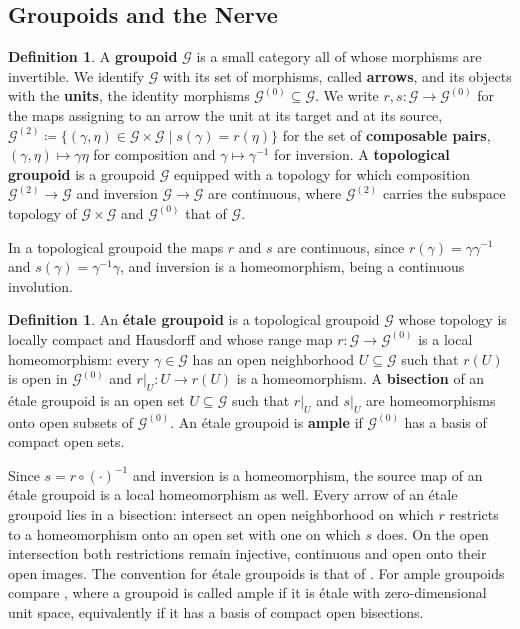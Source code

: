 \documentclass{extracta-temp-26}
\makeatletter
\numberwithin{equation}{section}
\theoremstyle{definition}
\newtheorem{defi}[teo]{Definition}
\theoremstyle{remark}
\newcommand{\G}{\mathcal{G}}
\newcommand{\restr}[2]{#1\rvert_{#2}}
\newcommand{\term}[1]{\textbf{#1}}
\newcommand{\keepwithnext}{\leavevmode\par\nobreak\@afterheading}
\newcommand{\subhead}[1]{\subsection*{#1}\keepwithnext}
\makeatother
\begin{document}
\subhead{Groupoids and the Nerve}

\begin{defi}\label{def:groupoid}
A \term{groupoid} \(\G\) is a small category all of whose morphisms are invertible.
We identify \(\G\) with its set of morphisms, called \term{arrows}, and its objects with the \term{units}, the identity morphisms \(\G^{(0)}\subseteq\G\).
We write \(r,s\colon\G\to\G^{(0)}\) for the maps assigning to an arrow the unit at its target and at its source, \(\G^{(2)}\coloneqq\{(\gamma,\eta)\in\G\times\G\mid s(\gamma)=r(\eta)\}\) for the set of \term{composable pairs}, \((\gamma,\eta)\mapsto\gamma\eta\) for composition and \(\gamma\mapsto\gamma^{-1}\) for inversion.
A \term{topological groupoid} is a groupoid \(\G\) equipped with a topology for which composition \(\G^{(2)}\to\G\) and inversion \(\G\to\G\) are continuous, where \(\G^{(2)}\) carries the subspace topology of \(\G\times\G\) and \(\G^{(0)}\) that of \(\G\).
\end{defi}

In a topological groupoid the maps \(r\) and \(s\) are continuous, since \(r(\gamma)=\gamma\gamma^{-1}\) and \(s(\gamma)=\gamma^{-1}\gamma\), and inversion is a homeomorphism, being a continuous involution.

\begin{defi}\label{def:etale}
An \term{\'etale groupoid} is a topological groupoid \(\G\) whose topology is locally compact and Hausdorff and whose range map \(r\colon\G\to\G^{(0)}\) is a local homeomorphism: every \(\gamma\in\G\) has an open neighborhood \(U\subseteq\G\) such that \(r(U)\) is open in \(\G^{(0)}\) and \(\restr{r}{U}\colon U\to r(U)\) is a homeomorphism.
A \term{bisection} of an \'etale groupoid is an open set \(U\subseteq\G\) such that \(\restr{r}{U}\) and \(\restr{s}{U}\) are homeomorphisms onto open subsets of \(\G^{(0)}\).
An \'etale groupoid is \term{ample} if \(\G^{(0)}\) has a basis of compact open sets.
\end{defi}

Since \(s=r\circ(\cdot)^{-1}\) and inversion is a homeomorphism, the source map of an \'etale groupoid is a local homeomorphism as well.
Every arrow of an \'etale groupoid lies in a bisection: intersect an open neighborhood on which \(r\) restricts to a homeomorphism onto an open set with one on which \(s\) does.
On the open intersection both restrictions remain injective, continuous and open onto their open images.
The convention for \'etale groupoids is that of \cite[Section~2]{matui2012homology}.
For ample groupoids compare \cite[Section~2.1]{farsi2019ample}, where a groupoid is called ample if it is \'etale with zero-dimensional unit space, equivalently if it has a basis of compact open bisections.
\end{document}
